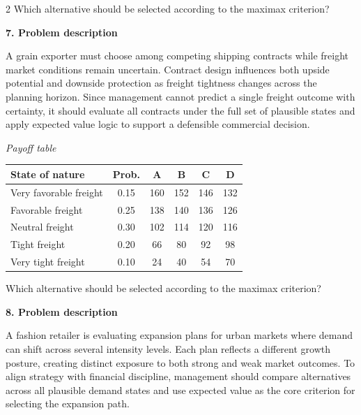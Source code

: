 \documentclass[12pt]{article}
\newcommand{\SubsectionBox}[1]{%
	\noindent\colorbox{gray!30}{%
		\parbox{\linewidth}{\textbf{#1}}%
	}\par\vspace{0.35cm}%
}
\begin{document}
\begin{multicols}{2}
				Which alternative should be selected according to the maximax criterion?

		\vspace{0.25cm}
		\SubsectionBox{7. Problem description}\vspace{-0.25cm}
		A grain exporter must choose among competing shipping contracts while freight market conditions remain uncertain. Contract design influences both upside potential and downside protection as freight tightness changes across the planning horizon. Since management cannot predict a single freight outcome with certainty, it should evaluate all contracts under the full set of plausible states and apply expected value logic to support a defensible commercial decision.
		
				\begin{center}
					\textit{Payoff table}
					\begin{tabular}{l c c c c c}
						\toprule
						State of nature & Prob. &  A & B & C & D \\
						\midrule
						Very favorable freight & 0.15 & 160 & 152 & 146 & 132 \\
						Favorable freight & 0.25 & 138 & 140 & 136 & 126 \\
						Neutral freight & 0.30 & 102 & 114 & 120 & 116 \\
						Tight freight & 0.20 & 66 & 80 & 92 & 98 \\
						Very tight freight & 0.10 & 24 & 40 & 54 & 70 \\
						\bottomrule
					\end{tabular}
				\end{center}
		
				Which alternative should be selected according to the maximax criterion?

		\vspace{0.25cm}
		\SubsectionBox{8. Problem description}\vspace{-0.25cm}
		A fashion retailer is evaluating expansion plans for urban markets where demand can shift across several intensity levels. Each plan reflects a different growth posture, creating distinct exposure to both strong and weak market outcomes. To align strategy with financial discipline, management should compare alternatives across all plausible demand states and use expected value as the core criterion for selecting the expansion path.
		

\end{multicols}
\end{document}
